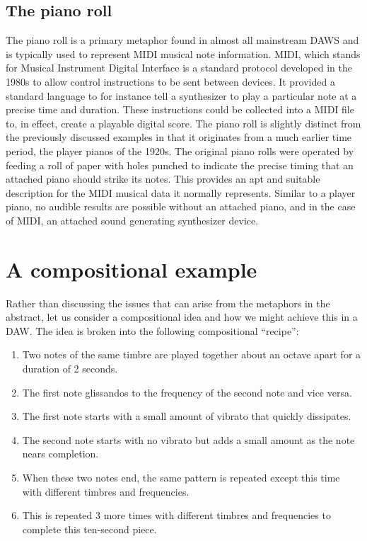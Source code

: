\documentclass[12pt]{report}
\begin{document}
\section{The piano roll}
\label{sec:orgb8347d0}
The piano roll is a primary metaphor found in almost all mainstream DAWS and is
typically used to represent MIDI musical note information. MIDI, which stands
for Musical Instrument Digital Interface is a standard protocol developed in the
1980s to allow control instructions to be sent between devices. It provided a
standard language to for instance tell a synthesizer to play a particular note
at a precise time and duration. These instructions could be collected into a
MIDI file to, in effect, create a playable digital score. The piano roll is
slightly distinct from the previously discussed examples in that it originates
from a much earlier time period, the player pianos of the 1920s. The original
piano rolls were operated by feeding a roll of paper with holes punched to
indicate the precise timing that an attached piano should strike its notes. This
provides an apt and suitable description for the MIDI musical data it normally
represents. Similar to a player piano, no audible results are possible without
an attached piano, and in the case of MIDI, an attached sound generating
synthesizer device. \cite{bell_journal_2015,levin_painterly_2000}

\chapter{A compositional example}
\label{sec:org71fd778}
Rather than discussing the issues that can arise from the metaphors in the
abstract, let us consider a compositional idea and how we might achieve this in
a DAW. The idea is broken into the following compositional ``recipe'':
\begin{enumerate}
\item Two notes of the same timbre are played together about an octave apart for a
duration of 2 seconds.
\item The first note glissandos to the frequency of the second note and vice versa.
\item The first note starts with a small amount of vibrato that quickly dissipates.
\item The second note starts with no vibrato but adds a small amount as the note
nears completion.
\item When these two notes end, the same pattern is repeated except this time with
different timbres and frequencies.
\item This is repeated 3 more times with different timbres and frequencies to
complete this ten-second piece.
\end{enumerate}
\end{document}
